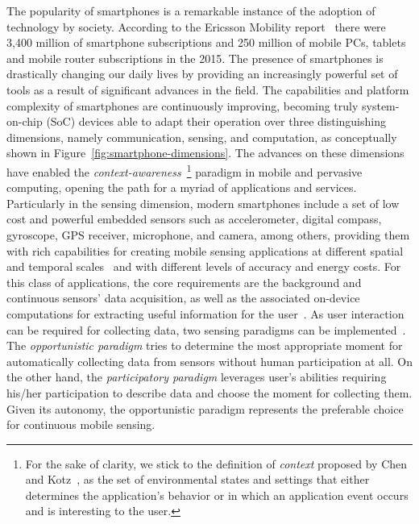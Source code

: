\documentclass[ENG,PhD]{cinvestav}
\begin{document}
The popularity of smartphones is a remarkable instance of the adoption of technology by society.
According to the Ericsson Mobility report~\cite{Ericsson2015} there were 3,400 million of smartphone subscriptions and 250 million of mobile PCs, tablets and mobile router subscriptions in the 2015.
The presence of smartphones is drastically changing our daily lives by providing an increasingly powerful set of tools as a result of significant advances in the field.
The capabilities and platform complexity of smartphones are continuously improving, becoming truly system-on-chip (SoC) devices able to adapt their operation over three distinguishing dimensions, namely communication, sensing, and computation, as conceptually shown in Figure~\ref{fig:smartphone-dimensions}.
The advances on these dimensions have enabled the \emph{context-awareness}~\footnote{For the sake of clarity, we stick to the definition of \emph{context} proposed by Chen and Kotz~\cite{Chen2000}, as the set of environmental states and settings that either determines the application’s behavior or in which an application event occurs and is interesting to the user.} paradigm in mobile and pervasive computing, opening the path for a myriad of applications and services.
Particularly in the sensing dimension, modern smartphones include a set of low cost and powerful embedded sensors such as accelerometer, digital compass, gyroscope, GPS receiver, microphone, and camera, among others, providing them with rich capabilities for creating mobile sensing applications at different spatial and temporal scales~\cite{Lane2010,Campbell2012,Kjaergaard2012} and with different levels of accuracy and energy costs.
For this class of applications, the core requirements are the background and continuous sensors' data acquisition, as well as the associated on-device computations for extracting useful information for the user~\cite{Lane2010,Ra2012}.
As user interaction can be required for collecting data, two sensing paradigms can be implemented~\cite{Lane2010}.
The \emph{opportunistic paradigm} tries to determine the most appropriate moment for automatically collecting data from sensors without human participation at all.
On the other hand, the \emph{participatory paradigm} leverages user's abilities requiring his/her participation to describe data and choose the moment for collecting them.
Given its autonomy, the opportunistic paradigm represents the preferable choice for continuous mobile sensing.
\end{document}
